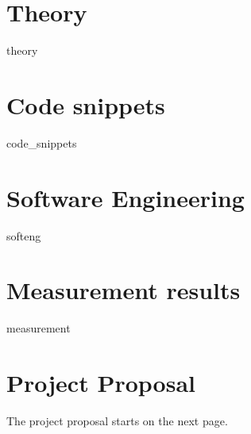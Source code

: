 \documentclass[%
    12pt,
    bibliography=toc,
    listof=leveldown,%
    oneside
]{book}
\begin{document}
\begin{appendices}
\renewcommand{\thepage}{\thechapter.\arabic{page}}

\chapter{Theory}
\label{app:theory}
\setcounter{page}{1}
{theory}

\chapter{Code snippets}
\label{code-snippets}
\setcounter{page}{1}
{code_snippets}

\chapter{Software Engineering}
\label{app:softeng}
\setcounter{page}{1}
{softeng}

\chapter{Measurement results}
\label{raw-data}
\setcounter{page}{1}
{measurement}

\chapter{Project Proposal}
\label{project-proposal}
\setcounter{page}{1}
The project proposal starts on the next page.


\end{appendices}
\end{document}
